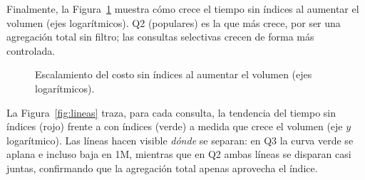 \documentclass[12pt,a4paper]{article}
\begin{document}
Finalmente, la Figura~\ref{fig:escala} muestra cómo crece el tiempo sin índices al
aumentar el volumen (ejes logarítmicos). Q2 (populares) es la que más crece, por
ser una agregación total sin filtro; las consultas selectivas crecen de forma más
controlada.

\begin{figure}[H]
\centering
{}
\caption{Escalamiento del costo sin índices al aumentar el volumen (ejes logarítmicos).}
\label{fig:escala}
\end{figure}

La Figura~\ref{fig:lineas} traza, para cada consulta, la tendencia del tiempo sin
índices (rojo) frente a con índices (verde) a medida que crece el volumen (eje $y$
logarítmico). Las líneas hacen visible \emph{dónde} se separan: en Q3 la curva
verde se aplana e incluso baja en 1M, mientras que en Q2 ambas líneas se disparan
casi juntas, confirmando que la agregación total apenas aprovecha el índice.
\end{document}
